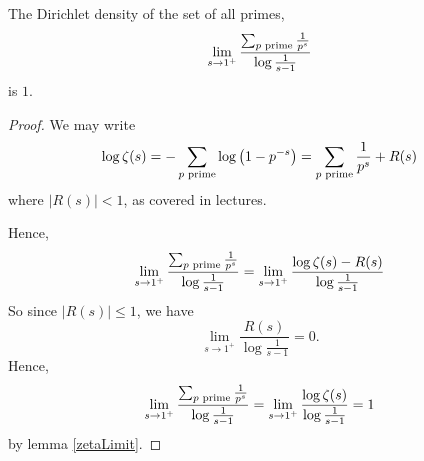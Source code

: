 \documentclass{unswmaths}
\begin{document}
    \begin{theorem}
        The Dirichlet density of the set of all primes,
        \begin{equation*}
            \lim_{s\rightarrow 1^+} \frac{\sum_{{{p\text{ prime}}}} \frac{1}{p^s}}{\log\frac{1}{s-1}}
        \end{equation*}
        is $1$. 
    \end{theorem}
    \begin{proof}
        We may write 
        \begin{equation*}
            \log\zeta(s) = -\sum_{{p\text{ prime}}} \log\left(1-p^{-s}\right) = \sum_{{p\text{ prime}}}\frac{1}{p^s}+R(s)
        \end{equation*}
        where $|R(s)| < 1$, as covered in lectures.
        
        Hence,
        \begin{equation*}
            \lim_{s\rightarrow 1^+} \frac{\sum_{{p\text{ prime}}}\frac{1}{p^s}}{\log\frac{1}{s-1}} = \lim_{s\rightarrow 1^+} \frac{\log\zeta(s)-R(s)}{\log\frac{1}{s-1}}
        \end{equation*}
        So since $|R(s)| \leq 1$, we have
        \begin{equation*}
            \lim_{s\rightarrow 1^+} \frac{R(s)}{\log\frac{1}{s-1}} = 0.
        \end{equation*}
        Hence,
        \begin{equation*}
            \lim_{s\rightarrow 1^+} \frac{\sum_{{p\text{ prime}}}\frac{1}{p^s}}{\log\frac{1}{s-1}} = \lim_{s\rightarrow 1^+} \frac{\log\zeta(s)}{\log\frac{1}{s-1}} = 1
        \end{equation*}
        by lemma \ref{zetaLimit}. 
    \end{proof}
    
\end{document}
